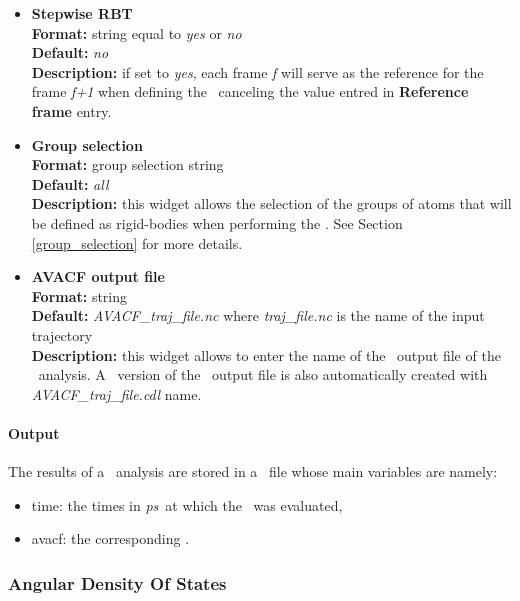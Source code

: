 \documentclass[a4paper,11pt]{report}
\newcommand{\ps}{\textit{ps}}
\begin{document}
\begin{itemize}
\hypertarget{avacf_stepwise_rbt}{}
\item \textbf{Stepwise RBT}\\
\textbf{Format:} string equal to \textit{yes} or \textit{no}\\
\textbf{Default:} \textit{no}\\
\textbf{Description:} if set to \textit{yes}, each frame \textit{f} will serve as the reference for the frame \textit{f+1} 
when defining the \RBT\ canceling the value entred in \textbf{Reference frame} entry.

\hypertarget{avacf_group_selection}{}
\item \textbf{Group selection}\\
\textbf{Format:} group selection string\\
\textbf{Default:} \textit{all}\\
\textbf{Description:} this widget allows the selection of the groups of atoms that will be defined as rigid-bodies 
when performing the \AVACF . See Section \ref{group_selection} for more details.

\hypertarget{avacf_avacf_output_file}{}
\item \textbf{AVACF output file}\\
\textbf{Format:} string\\
\textbf{Default:} \textit{AVACF\_traj\_file.nc} where \textit{traj\_file.nc} is the name of the input trajectory\\
\textbf{Description:} this widget allows to enter the name of the \NetCDF\ output file of the \AVACF\ analysis. A \CDL\ 
version of the \NetCDF\ output file is also automatically created with \textit{AVACF\_traj\_file.cdl} name.
\end{itemize}

\paragraph{Output\\}
The results of a \AVACF\ analysis are stored in a \NetCDF\ file whose main variables are namely:
\begin{itemize}
\item time: the times in \ps\ at which the \AVACF\ was evaluated,
\item avacf: the corresponding \AVACF.
\end{itemize}

\subsubsection{Angular Density Of States}
\label{ados}
\end{document}
